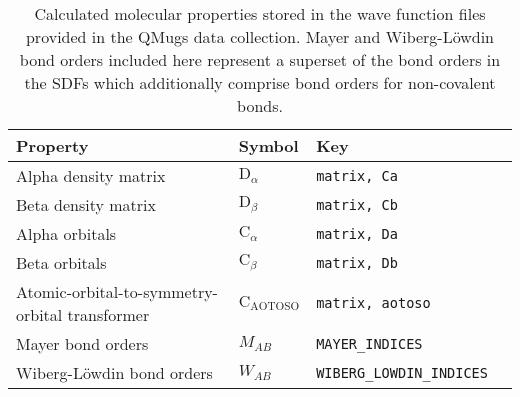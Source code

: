 \begin{table}[ht]
\caption{Calculated molecular properties stored in the wave function files provided in the QMugs data collection. Mayer and Wiberg-L\"owdin bond orders included here represent a superset of the bond orders in the SDFs which additionally comprise bond orders for non-covalent bonds.}
\label{tbl:wfn}
\centering
\begin{tabular}{llll}
\toprule
\textbf{Property}                                        & \textbf{Symbol}                               & \textbf{Key}                            \\ \midrule
Alpha density matrix                                     & $\mathrm{D}_{\alpha}$                         & \texttt{matrix, Ca}                              \\
Beta density matrix                                      & $\mathrm{D}_{\beta}$                          & \texttt{matrix, Cb}                              \\
Alpha orbitals                                           & $\mathrm{C}_{\alpha}$                         & \texttt{matrix, Da}                              \\
Beta orbitals                                            & $\mathrm{C}_{\beta}$                          & \texttt{matrix, Db}                              \\
Atomic-orbital-to-symmetry-orbital transformer           & $\mathrm{C}_{\mathrm{AOTOSO}}$                & \texttt{matrix, aotoso}                          \\
Mayer bond orders                                        & $M_{AB}$                                      & \texttt{MAYER\_INDICES}                          \\
Wiberg-L\"owdin bond orders                              & $W_{AB}$                                      & \texttt{WIBERG\_LOWDIN\_INDICES}                 \\ \bottomrule
\end{tabular}
\end{table}